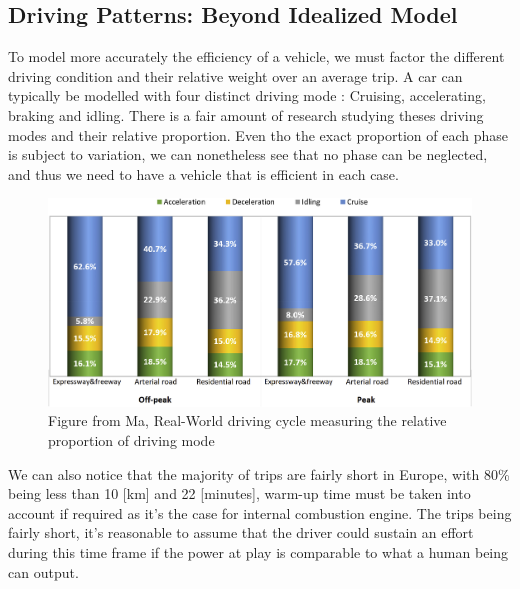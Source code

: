 \subsection{Driving Patterns: Beyond Idealized Model}

To model more accurately the efficiency of a vehicle, we must factor the different driving condition and their relative weight over an average trip. A car can typically be modelled with four distinct driving mode : Cruising, accelerating, braking and idling. There is a fair amount of research studying theses driving modes and their relative proportion. Even tho the exact proportion of each phase is subject to variation, we can nonetheless see that no phase can be neglected, and thus we need to have a vehicle that is efficient in each case.

\begin{figure}[h!]
    \centering
    \includegraphics[width=0.8\linewidth]{Figures/ch2_shareOfDrivingModeChina.jpg}
    \caption{Figure from Ma, Real-World driving cycle\cite{ma_real-world_2019} measuring the relative proportion of driving mode}
    \label{fig:ch2proportiondrivingmode}
\end{figure}

We can also notice that the majority of trips are fairly short in Europe, with 80\% being less than 10 [km] and 22 [minutes], warm-up time must be taken into account if required as it's the case for internal combustion engine. The trips being fairly short, it's reasonable to assume that the driver could sustain an effort during this time frame if the power at play is comparable to what a human being can output.

